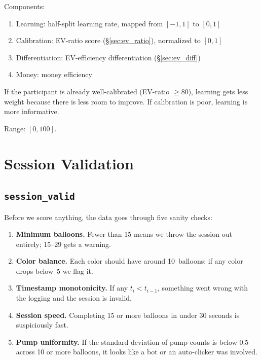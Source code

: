 \documentclass[11pt,a4paper]{article}
\begin{document}
Components:
\begin{enumerate}[nosep]
    \item Learning: half-split learning rate, mapped from $[-1,1]$ to $[0,1]$
    \item Calibration: EV-ratio score (\S\ref{sec:ev_ratio}),
          normalized to $[0,1]$
    \item Differentiation: EV-efficiency differentiation
          (\S\ref{sec:ev_diff})
    \item Money: money efficiency
\end{enumerate}

If the participant is already well-calibrated (EV-ratio $\geq 80$),
learning gets less weight because there is less room to improve.
If calibration is poor, learning is more informative.

Range: $[0, 100]$.


\section{Session Validation}

\subsection{\texttt{session\_valid}}

Before we score anything, the data goes through five sanity checks:

\begin{enumerate}
    \item \textbf{Minimum balloons.}  Fewer than 15 means we throw the session
          out entirely; 15--29 gets a warning.
    \item \textbf{Color balance.}  Each color should have around 10~balloons;
          if any color drops below~5 we flag it.
    \item \textbf{Timestamp monotonicity.}  If any $t_i < t_{i-1}$, something
          went wrong with the logging and the session is invalid.
    \item \textbf{Session speed.}  Completing 15 or more balloons in under 30
          seconds is suspiciously fast.
    \item \textbf{Pump uniformity.}  If the standard deviation of pump counts
          is below $0.5$ across 10 or more balloons, it looks like a bot or
          an auto-clicker was involved.
\end{enumerate}
\end{document}
